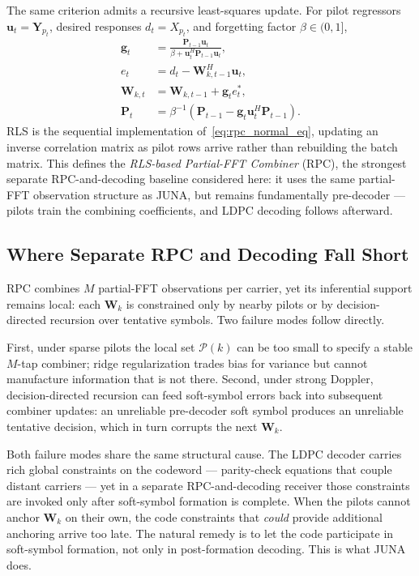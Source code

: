 \documentclass{wileysev}
\begin{document}
	The same criterion admits a recursive least-squares update. For pilot regressors \(\mathbf{u}_t=\mathbf{Y}_{p_t}\), desired responses \(d_t=X_{p_t}\), and forgetting factor \(\beta\in(0,1]\),
	\begin{align}
		\mathbf{g}_t
		&=
		\frac{\mathbf{P}_{t-1}\mathbf{u}_t}
		{\beta+\mathbf{u}_t^{H}\mathbf{P}_{t-1}\mathbf{u}_t},
		\\
		e_t
		&=
		d_t-\mathbf{W}_{k,t-1}^{H}\mathbf{u}_t,
		\\
		\mathbf{W}_{k,t}
		&=
		\mathbf{W}_{k,t-1}+\mathbf{g}_t e_t^{*},
		\\
		\mathbf{P}_t
		&=
		\beta^{-1}
		\left(
		\mathbf{P}_{t-1}
		-
		\mathbf{g}_t\mathbf{u}_t^{H}\mathbf{P}_{t-1}
		\right).
		\label{eq:rpc_rls}
	\end{align}
	RLS is the sequential implementation of~\eqref{eq:rpc_normal_eq}, updating an inverse correlation matrix as pilot rows arrive rather than rebuilding the batch matrix. This defines the \emph{RLS-based Partial-FFT Combiner} (RPC), the strongest separate RPC-and-decoding baseline considered here: it uses the same partial-FFT observation structure as JUNA, but remains fundamentally pre-decoder --- pilots train the combining coefficients, and LDPC decoding follows afterward.
	
	\subsection{Where Separate RPC and Decoding Fall Short}
	\label{ssec:separate_rpc_decoding_limit}
	
	RPC combines \(M\) partial-FFT observations per carrier, yet its inferential support remains local: each \(\mathbf{W}_k\) is constrained only by nearby pilots or by decision-directed recursion over tentative symbols. Two failure modes follow directly.
	
	First, under sparse pilots the local set \(\mathcal{P}(k)\) can be too small to specify a stable \(M\)-tap combiner; ridge regularization trades bias for variance but cannot manufacture information that is not there. Second, under strong Doppler, decision-directed recursion can feed soft-symbol errors back into subsequent combiner updates: an unreliable pre-decoder soft symbol produces an unreliable tentative decision, which in turn corrupts the next \(\mathbf{W}_k\).
	
	Both failure modes share the same structural cause. The LDPC decoder carries rich global constraints on the codeword --- parity-check equations that couple distant carriers --- yet in a separate RPC-and-decoding receiver those constraints are invoked only after soft-symbol formation is complete. When the pilots cannot anchor \(\mathbf{W}_k\) on their own, the code constraints that \emph{could} provide additional anchoring arrive too late. The natural remedy is to let the code participate in soft-symbol formation, not only in post-formation decoding. This is what JUNA does.
	
\end{document}
